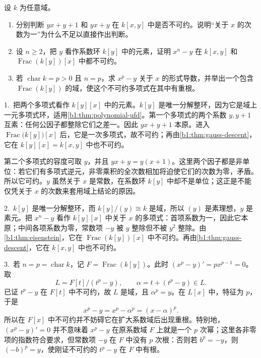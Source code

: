 \begin{exercise}\label{b1:ex:12-primitive-linear-polynomials}
	设 \(k\) 为任意域。
	\begin{enumerate}
		\item 分别判断 \(yx+y+1\) 和 \(yx+y\) 在 \(k[x,y]\) 中是否不可约。说明“关于 \(x\) 的次数为一”为什么不足以直接作出判断。
		\item 设 \(n\ge2\)，把 \(y\) 看作系数环 \(k[y]\) 中的元素，证明 \(x^n-y\) 在 \(k[x,y]\) 和 \(\operatorname{Frac}(k[y])[x]\) 中都不可约。
		\item 若 \(\operatorname{char}k=p>0\) 且 \(n=p\)，求 \(x^p-y\) 关于 \(x\) 的形式导数，并举出一个包含 \(\operatorname{Frac}(k[y])\) 的域，使这个不可约多项式在其中有重根。
	\end{enumerate}
\end{exercise}
\begin{solution}
	1.\ 把两个多项式看作 \(k[y][x]\) 中的元素。\(k[y]\) 是唯一分解整环，因为它是域上一元多项式环，适用\cref{b1:thm:polynomial-ufd}。第一个多项式的两个系数 \(y,y+1\) 互素：任何公因子都整除它们之差一。因此 \(yx+y+1\) 本原。进入 \(\operatorname{Frac}\bigl(k[y]\bigr)[x]\) 后，它是一次多项式，故不可约；再由\cref{b1:thm:gauss-descent}，它在 \(k[y][x]=k[x,y]\) 中也不可约。

	第二个多项式的容度可取 \(y\)，并且 \(yx+y=y(x+1)\)。这里两个因子都是非单位：若它们有多项式逆元，非零乘积的全次数相加将迫使它们的次数为零，矛盾。所以它可约。\(y\) 虽然关于 \(x\) 是常数，在系数环 \(k[y]\) 中却不是单位；这正是不能仅凭关于 \(x\) 的次数来套用域上结论的原因。

	2.\ \(k[y]\) 是唯一分解整环，而 \(k[y]/(y)\cong k\) 是域，所以 \((y)\) 是素理想，\(y\) 是素元。把 \(x^n-y\) 看作 \(k[y][x]\) 中关于 \(x\) 的多项式：首项系数为一，因此它本原；中间各项系数为零，常数项 \(-y\) 被 \(y\) 整除但不被 \(y^2\) 整除。由\cref{b1:thm:eisenstein}，它在 \(\operatorname{Frac}(k[y])[x]\) 中不可约。再由\cref{b1:thm:gauss-descent}，它在 \(k[x,y]\) 中也不可约。

	3.\ 若 \(n=p=\operatorname{char}k\)，记 \(F=\operatorname{Frac}(k[y])\)。此时 \((x^p-y)'=px^{p-1}=0\)。取
	\[
		L=F[t]/(t^p-y),\qquad \alpha=t+(t^p-y)\in L.
	\]
	已证 \(t^p-y\) 在 \(F[t]\) 中不可约，故 \(L\) 是域，且 \(\alpha^p=y\)。在 \(L[x]\) 中，特征为 \(p\)，于是
	\[
		x^p-y=x^p-\alpha^p=(x-\alpha)^p.
	\]
	所以在 \(F[x]\) 中不可约并不妨碍它在扩大系数域后出现重根。特别地，\((x^p-y)'=0\) 并不意味着 \(x^p-y\) 在原系数域 \(F\) 上就是一个 \(p\) 次幂；这里各非零项的指数符合要求，但常数项 \(-y\) 在 \(F\) 中没有 \(p\) 次根：否则若 \(b^p=-y\)，则 \((-b)^p=y\)，使刚证不可约的 \(t^p-y\) 在 \(F\) 中有根。
\end{solution}

